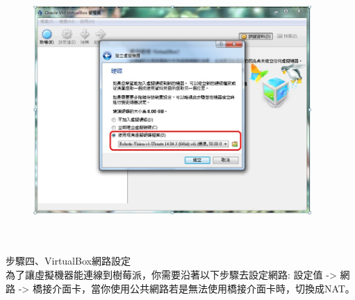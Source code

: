 \documentclass{article}
\begin{document}
\begin{figure}[htp]
    \begin{center}
        \includegraphics[width=300pt]{pic/圖片5.jpg}
    \end{center}
\end{figure}
\\
\\步驟四、VirtualBox網路設定
\\為了讓虛擬機器能連線到樹莓派，你需要沿著以下步驟去設定網路:
設定值 -> 網路 -> 橋接介面卡，當你使用公共網路若是無法使用橋接介面卡時，切換成NAT。
\end{document}
